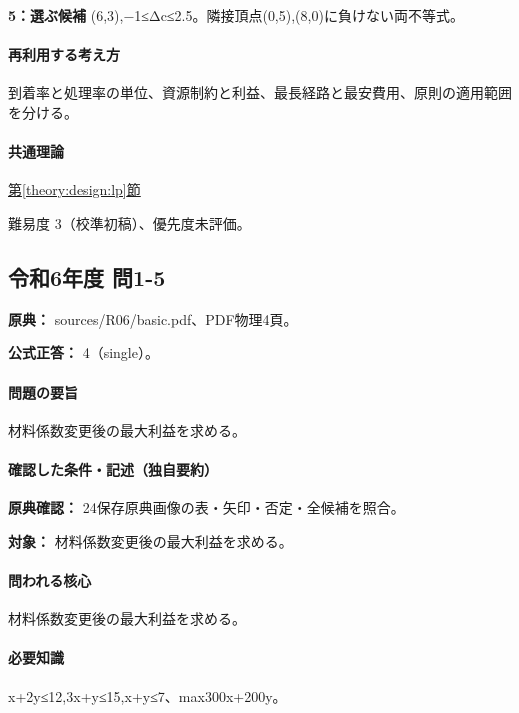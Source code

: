 \noindent\textbf{5：選ぶ候補} (6,3),−1≤Δc≤2.5。隣接頂点(0,5),(8,0)に負けない両不等式。\par

\paragraph{再利用する考え方} 到着率と処理率の単位、資源制約と利益、最長経路と最安費用、原則の適用範囲を分ける。

\paragraph{共通理論} \hyperref[theory:design:lp]{第\ref*{theory:design:lp}節}

\par 難易度 3（校準初稿）、優先度未評価。

\subsection{令和6年度 問1-5}
\label{q:r06-reg-basic-1-5}

\noindent\textbf{原典：} sources/R06/basic.pdf、PDF物理4頁。

\textbf{公式正答：} 4（single）。

\paragraph{問題の要旨} 材料係数変更後の最大利益を求める。

\paragraph{確認した条件・記述（独自要約）}\mbox{}\par

\noindent\textbf{原典確認：} 24保存原典画像の表・矢印・否定・全候補を照合。\par

\noindent\textbf{対象：} 材料係数変更後の最大利益を求める。\par

\paragraph{問われる核心} 材料係数変更後の最大利益を求める。

\paragraph{必要知識} x+2y≤12,3x+y≤15,x+y≤7、max300x+200y。


